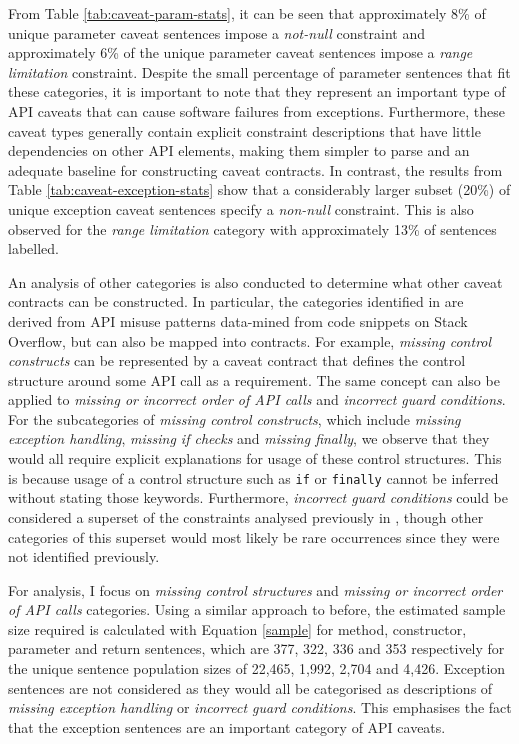 From Table \ref{tab:caveat-param-stats}, it can be seen that approximately 8\% of unique parameter caveat sentences impose a \textit{not-null} constraint and approximately 6\% of the unique parameter caveat sentences impose a \textit{range limitation} constraint. Despite the small percentage of parameter sentences that fit these categories, it is important to note that they represent an important type of API caveats that can cause software failures from exceptions. Furthermore, these caveat types generally contain explicit constraint descriptions that have little dependencies on other API elements, making them simpler to parse and an adequate baseline for constructing caveat contracts. In contrast, the results from Table \ref{tab:caveat-exception-stats} show that a considerably larger subset (20\%) of unique exception caveat sentences specify a \textit{non-null} constraint. This is also observed for the \textit{range limitation} category with approximately 13\% of sentences labelled. \bigbreak

An analysis of other categories is also conducted to determine what other caveat contracts can be constructed. In particular, the categories identified in \cite{code-examples} are derived from API misuse patterns data-mined from code snippets on Stack Overflow, but can also be mapped into contracts. For example, \textit{missing control constructs} can be represented by a caveat contract that defines the control structure around some API call as a requirement. The same concept can also be applied to \textit{missing or incorrect order of API calls} and \textit{incorrect guard conditions}. For the subcategories of \textit{missing control constructs}, which include \textit{missing exception handling}, \textit{missing if checks} and \textit{missing finally}, we observe that they would all require explicit explanations for usage of these control structures. This is because usage of a control structure such as \lstinline{if} or \lstinline{finally} cannot be inferred without stating those keywords. Furthermore, \textit{incorrect guard conditions} could be considered a superset of the constraints analysed previously in \cite{zhou-directive}, though other categories of this superset would most likely be rare occurrences since they were not identified previously. \bigbreak

For analysis, I focus on \textit{missing control structures} and \textit{missing or incorrect order of API calls} categories. Using a similar approach to before, the estimated sample size required is calculated with Equation \ref{sample} for method, constructor, parameter and return sentences, which are 377, 322, 336 and 353 respectively for the unique sentence population sizes of 22,465, 1,992, 2,704 and 4,426. Exception sentences are not considered as they would all be categorised as descriptions of \textit{missing exception handling} or \textit{incorrect guard conditions}. This emphasises the fact that the exception sentences are an important category of API caveats. 

